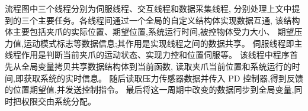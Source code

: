流程图中三个线程分别为伺服线程、交互线程和数据采集线程,
分别处理上文中提到的三个主要任务。各线程间通过一个全局的自定义结构体实现数据互通,
该结构体主要包括夹爪的实际位置、期望位置,系统运行时间,被控物体受力大小、
期望压力值,运动模式标志等数据信息;其作用是实现线程之间的数据共享。
伺服线程即主线程作用是判断当前夹爪的运动状态、实现力控和位置伺服等。
该线程中程序首先从全局变量拷贝共享数据结构体到当前函数,
读取夹爪当前位置和系统运行的时间,即获取系统的实时信息。
随后读取压力传感器数据并传入 PD 控制器,得到反馈的位置期望值,并发送控制指令。
最后将这一周期中改变的数据同步到全局变量,同时把权限交由系统分配。

\begin{figure}[!ht]
\centering
    \hspace{25pt}
\end{figure}
